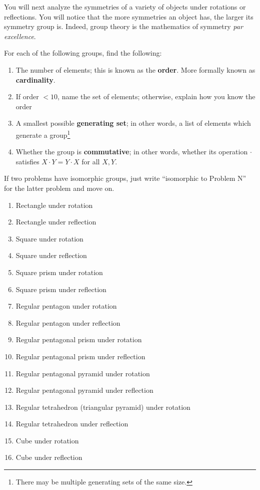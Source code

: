 \documentclass[../gatm.tex]{subfiles}
\begin{document}
You will next analyze the symmetries of a variety of objects under rotations or reflections. You will notice that the more symmetries an object has, the larger its symmetry group is. Indeed, group theory is the mathematics of symmetry \textit{par excellence}.

For each of the following groups, find the following:

\begin{enumerate}[label=(\alph*)]
\item The number of elements; this is known as the \textbf{order}. More formally known as \textbf{cardinality}.
\item If order $< 10$, name the set of elements; otherwise, explain how you know the order
\item A smallest possible \textbf{generating set}; in other words, a list of elements which generate a group\footnote{There may be multiple generating sets of the same size.}
\item Whether the group is \textbf{commutative}; in other words, whether its operation $\cdot$ satisfies $X\cdot Y=Y\cdot X$ for all $X,Y$. %
\end{enumerate}

\noindent If two problems have isomorphic groups, just write ``isomorphic to Problem N'' for the latter problem and move on.

\begin{multicols}{2}
\begin{enumerate}
\setcounter{enumi}{\value{rrg_problem_i}}
\item Rectangle under rotation
\item Rectangle under reflection
\item Square under rotation
\item Square under reflection
\item Square prism under rotation
\item Square prism under reflection
\item Regular pentagon under rotation
\item Regular pentagon under reflection
\item Regular pentagonal prism under rotation
\item Regular pentagonal prism under reflection
\item Regular pentagonal pyramid under rotation
\item Regular pentagonal pyramid under reflection
\item Regular tetrahedron (triangular pyramid) under rotation
\item Regular tetrahedron under reflection
\item Cube under rotation
\item Cube under reflection
\end{enumerate}
\end{multicols}
\end{document}
